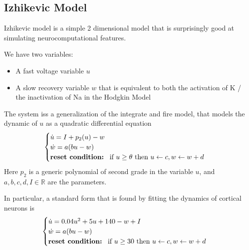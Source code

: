\documentclass[oneside]{book}
\newcommand{\R}{\mathbb{R}}
\theoremstyle{definition}
\theoremstyle{plain}
\begin{document}
\subsection{Izhikevic Model}

Izhikevic model is a simple 2 dimensional model that is surprisingly good at simulating neurocomputational features.

We have two variables:
\begin{itemize}
    \item A fast voltage variable $u$
    \item A slow recovery variable $w$ that is equivalent to both the activation of K / the inactivation of Na in the Hodgkin Model
\end{itemize}

The system iss a generalization of the integrate and fire model, that models the dynamic of $u$ as a quadratic differential equation
\begin{equation}\label{eqn:izhikevic-generic}
    \begin{cases}
        \dot{u} =I + p_2(u) -w \\
        \dot{w} = a(bu-w)\\
        \text{\textbf{reset condition: }} \text{ if } u\geq \theta \text{ then } u\leftarrow c, w\leftarrow w+d 
    \end{cases}
\end{equation}
Here $p_2$ is a generic polynomial of second grade in the variable $u$, and $a, b,c,d,I\in \R$ are the parameters.

In particular, a standard form that is found by fitting the dynamics of cortical neurons is
\begin{equation}\label{eqn:izhikevic-}
    \begin{cases}
        \dot{u} = 0.04u^2+5u+140-w + I\\
        \dot{w} = a(bu-w)\\
        \text{\textbf{reset condition: }} \text{ if } u\geq 30 \text{ then } u\leftarrow c, w\leftarrow w+d 
    \end{cases}
\end{equation}
\end{document}
